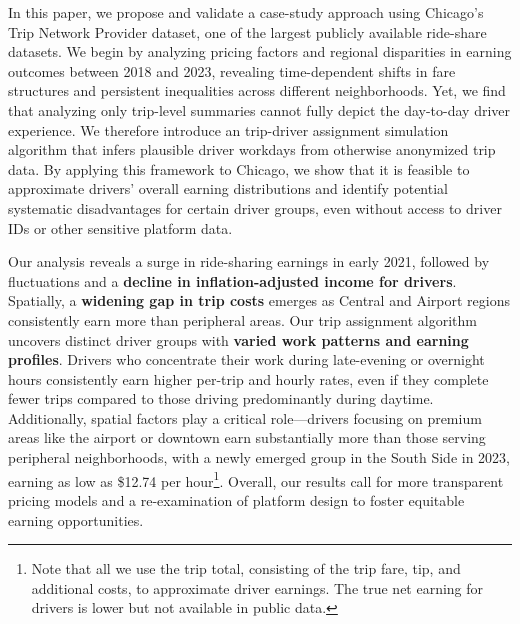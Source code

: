 In this paper, we propose and validate a case-study approach using Chicago’s Trip Network Provider dataset, one of the largest publicly available ride-share datasets. We begin by analyzing pricing factors and regional disparities in earning outcomes between 2018 and 2023, revealing time-dependent shifts in fare structures and persistent inequalities across different neighborhoods. Yet, we find that analyzing only trip-level summaries cannot fully depict the day-to-day driver experience. We therefore introduce an trip-driver assignment simulation algorithm that infers plausible driver workdays from otherwise anonymized trip data. By applying this framework to Chicago, we show that it is feasible to approximate drivers’ overall earning distributions and identify potential systematic disadvantages for certain driver groups, even without access to driver IDs or other sensitive platform data.

Our analysis reveals a surge in ride-sharing earnings in early 2021, followed by fluctuations and a \textbf{decline in inflation-adjusted income for drivers}. Spatially, a \textbf{widening gap in trip costs} emerges as Central and Airport regions consistently earn more than peripheral areas. Our trip assignment algorithm uncovers distinct driver groups with \textbf{varied work patterns and earning profiles}. Drivers who concentrate their work during late-evening or overnight hours consistently earn higher per-trip and hourly rates, even if they complete fewer trips compared to those driving predominantly during daytime. Additionally, spatial factors play a critical role---drivers focusing on premium areas like the airport or downtown earn substantially more than those serving peripheral neighborhoods, with a newly emerged group in the South Side in 2023, earning as low as \$12.74 per hour\footnote{Note that all we use the trip total, consisting of the trip fare, tip, and additional costs, to approximate driver earnings. The true net earning for drivers is lower but not available in public data.}. Overall, our results call for more transparent pricing models and a re-examination of platform design to foster equitable earning opportunities.






